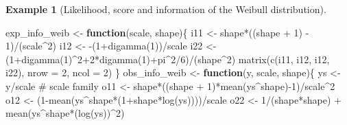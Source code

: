 \documentclass[
  11pt,
  letterpaper,
]{scrbook}
\newenvironment{Shaded}{\begin{snugshade}}{\end{snugshade}}
\newcommand{\AttributeTok}[1]{\textcolor[rgb]{0.40,0.45,0.13}{#1}}
\newcommand{\CommentTok}[1]{\textcolor[rgb]{0.37,0.37,0.37}{#1}}
\newcommand{\ControlFlowTok}[1]{\textcolor[rgb]{0.00,0.23,0.31}{\textbf{#1}}}
\newcommand{\DecValTok}[1]{\textcolor[rgb]{0.68,0.00,0.00}{#1}}
\newcommand{\FunctionTok}[1]{\textcolor[rgb]{0.28,0.35,0.67}{#1}}
\newcommand{\NormalTok}[1]{\textcolor[rgb]{0.00,0.23,0.31}{#1}}
\newcommand{\OtherTok}[1]{\textcolor[rgb]{0.00,0.23,0.31}{#1}}
\newcommand{\SpecialCharTok}[1]{\textcolor[rgb]{0.37,0.37,0.37}{#1}}
\theoremstyle{definition}
\newtheorem{example}{Example}[chapter]
\theoremstyle{plain}
\theoremstyle{plain}
\theoremstyle{plain}
\theoremstyle{definition}
\theoremstyle{definition}
\theoremstyle{plain}
\theoremstyle{plain}
\theoremstyle{remark}
\begin{document}
\begin{example}[Likelihood, score and information of the Weibull
distribution]
\begin{Shaded}
\begin{Highlighting}[]
\NormalTok{exp\_info\_weib }\OtherTok{\textless{}{-}} \ControlFlowTok{function}\NormalTok{(scale, shape)\{}
\NormalTok{  i11 }\OtherTok{\textless{}{-}}\NormalTok{ shape}\SpecialCharTok{*}\NormalTok{((shape }\SpecialCharTok{+} \DecValTok{1}\NormalTok{) }\SpecialCharTok{{-}} \DecValTok{1}\NormalTok{)}\SpecialCharTok{/}\NormalTok{(scale}\SpecialCharTok{\^{}}\DecValTok{2}\NormalTok{)}
\NormalTok{  i12 }\OtherTok{\textless{}{-}} \SpecialCharTok{{-}}\NormalTok{(}\DecValTok{1}\SpecialCharTok{+}\FunctionTok{digamma}\NormalTok{(}\DecValTok{1}\NormalTok{))}\SpecialCharTok{/}\NormalTok{scale}
\NormalTok{  i22 }\OtherTok{\textless{}{-}}\NormalTok{ (}\DecValTok{1}\SpecialCharTok{+}\FunctionTok{digamma}\NormalTok{(}\DecValTok{1}\NormalTok{)}\SpecialCharTok{\^{}}\DecValTok{2}\SpecialCharTok{+}\DecValTok{2}\SpecialCharTok{*}\FunctionTok{digamma}\NormalTok{(}\DecValTok{1}\NormalTok{)}\SpecialCharTok{+}\NormalTok{pi}\SpecialCharTok{\^{}}\DecValTok{2}\SpecialCharTok{/}\DecValTok{6}\NormalTok{)}\SpecialCharTok{/}\NormalTok{(shape}\SpecialCharTok{\^{}}\DecValTok{2}\NormalTok{)}
  \FunctionTok{matrix}\NormalTok{(}\FunctionTok{c}\NormalTok{(i11, i12, i12, i22), }\AttributeTok{nrow =} \DecValTok{2}\NormalTok{, }\AttributeTok{ncol =} \DecValTok{2}\NormalTok{)}
\NormalTok{\}}
\NormalTok{obs\_info\_weib }\OtherTok{\textless{}{-}} \ControlFlowTok{function}\NormalTok{(y, scale, shape)\{}
\NormalTok{  ys }\OtherTok{\textless{}{-}}\NormalTok{ y}\SpecialCharTok{/}\NormalTok{scale }\CommentTok{\# scale family}
\NormalTok{  o11 }\OtherTok{\textless{}{-}}\NormalTok{ shape}\SpecialCharTok{*}\NormalTok{((shape }\SpecialCharTok{+} \DecValTok{1}\NormalTok{)}\SpecialCharTok{*}\FunctionTok{mean}\NormalTok{(ys}\SpecialCharTok{\^{}}\NormalTok{shape)}\SpecialCharTok{{-}}\DecValTok{1}\NormalTok{)}\SpecialCharTok{/}\NormalTok{scale}\SpecialCharTok{\^{}}\DecValTok{2}
\NormalTok{  o12 }\OtherTok{\textless{}{-}}\NormalTok{ (}\DecValTok{1}\SpecialCharTok{{-}}\FunctionTok{mean}\NormalTok{(ys}\SpecialCharTok{\^{}}\NormalTok{shape}\SpecialCharTok{*}\NormalTok{(}\DecValTok{1}\SpecialCharTok{+}\NormalTok{shape}\SpecialCharTok{*}\FunctionTok{log}\NormalTok{(ys))))}\SpecialCharTok{/}\NormalTok{scale}
\NormalTok{  o22 }\OtherTok{\textless{}{-}} \DecValTok{1}\SpecialCharTok{/}\NormalTok{(shape}\SpecialCharTok{*}\NormalTok{shape) }\SpecialCharTok{+} \FunctionTok{mean}\NormalTok{(ys}\SpecialCharTok{\^{}}\NormalTok{shape}\SpecialCharTok{*}\NormalTok{(}\FunctionTok{log}\NormalTok{(ys))}\SpecialCharTok{\^{}}\DecValTok{2}\NormalTok{)}

\end{Highlighting}
\end{Shaded}
\end{example}
\end{document}
